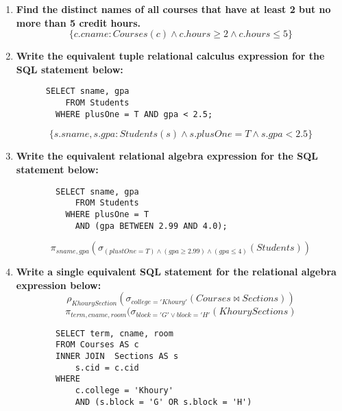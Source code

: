 \documentclass{article}
\begin{document}
\begin{enumerate}
     \item \textbf{Find the distinct names of all courses that have at least 2 but no more than 5 credit hours.}
     \[\{c.cname: Courses(c) \land c.hours \ge 2 \land c.hours \le 5\}\]

     \item \textbf{Write the equivalent tuple relational calculus expression for the SQL statement below:}
     \begin{lstlisting}
      SELECT sname, gpa 
          FROM Students
        WHERE plusOne = T AND gpa < 2.5;
    \end{lstlisting}
    \[\{s.sname, s.gpa: Students(s) \land s.plusOne = T \land s.gpa < 2.5\}\]

    \item \textbf{Write the equivalent relational algebra expression for the SQL statement below:}
    \begin{lstlisting}
        SELECT sname, gpa
            FROM Students
          WHERE plusOne = T 
            AND (gpa BETWEEN 2.99 AND 4.0);
    \end{lstlisting}
    \[\pi_{sname, gpa}(\sigma_{(plustOne = T) \land (gpa \ge 2.99) \land (gpa \le 4)}(Students))\]

    \item \textbf{Write a single equivalent SQL statement for the relational algebra expression below:}
    \[\rho_{KhourySection}(\sigma_{college='Khoury'}(Courses \bowtie Sections))\]
    \[\pi_{term, cname, room}(\sigma_{block='G' \lor block='H'}(KhourySections)\]
    \begin{lstlisting}
        SELECT term, cname, room
        FROM Courses AS c
        INNER JOIN  Sections AS s
            s.cid = c.cid
        WHERE 
            c.college = 'Khoury' 
            AND (s.block = 'G' OR s.block = 'H')
    \end{lstlisting}
\end{enumerate}
\end{document}
